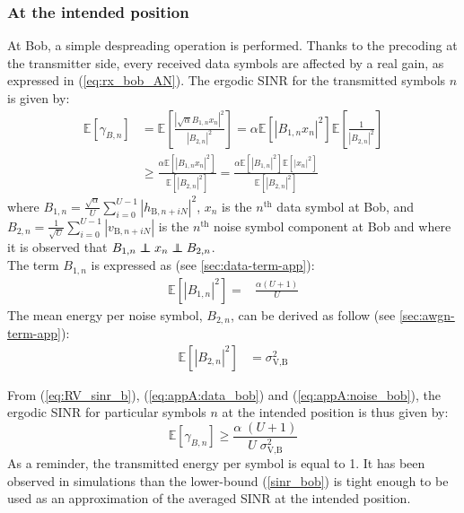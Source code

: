 \documentclass[journal,comsoc]{IEEEtran}
\newcommand{\EX}[1]{\mathbb{E} \left[#1\right]}%
\newcommand\independent{\protect\mathpalette{\protect\independenT}{\perp}}
\def\independenT#1#2{\mathrel{\rlap{$#1#2$}\mkern2mu{#1#2}}}
\begin{document}
\subsubsection{At the intended position}
At Bob, a simple despreading operation is performed. Thanks to the precoding at the transmitter side, every received data symbols are affected by a real gain, as expressed in (\ref{eq:rx_bob_AN}). The ergodic SINR for the transmitted symbols $n$ is given by:
\begin{equation}
\begin{split}
\EX{\gamma_{B,n}} &= \EX{ \frac{  \left| \sqrt{\alpha} B_{1,n} x_n \right|^2  }{  \left| B_{2,n} \right|^2} }  = \alpha \EX{\left| B_{1,n}  x_n\right|^2}  \EX{\frac{1}{\left| B_{2,n} \right|^2}}  \\
& \geq  \frac{\alpha \EX{  \left| B_{1,n}  x_n\right|^2 } }{\EX{ \left| B_{2,n} \right|^2 }} =  \frac{\alpha \EX{ \left|B_{1,n}  \right|^2 } \EX{ \left| x_n \right|^2 } }{\EX{ \left| B_{2,n} \right|^2 }}
\label{eq:RV_sinr_b}
\end{split}
\end{equation}
where $B_{1,n} = \frac{\sqrt{\alpha}}{U}\sum_{i=0}^{U-1} \left| h_{\text{B}, n + iN}\right|^2$, $x_n$ is the $n^{\text{th}}$ data symbol at Bob, and $B_{2,n} = \frac{1}{\sqrt{U}}\sum_{i=0}^{U-1} \left| v_{\text{B}, n + iN}\right|$ is the $n^{\text{th}}$ noise symbol component at Bob and where it is observed that $B_{1,n} \independent x_n \independent B_{2,n}$.\\
The term $B_{1,n}$ is expressed as (see \ref{sec:data-term-app}):
\begin{equation}
	\begin{split}
	\EX{|B_{1,n}|^2} =& \frac{\alpha (U+1)}{U}
	\end{split}
	\label{eq:appA:data_bob}
\end{equation}
The mean energy per noise symbol, $B_{2,n}$, can be derived as follow (see \ref{sec:awgn-term-app}):
\begin{equation}
	\begin{split}
	\EX{|B_{2,n}|^2} &= \sigma^2_{\text{V,B}}
	\end{split}
	\label{eq:appA:noise_bob}
\end{equation}

From (\ref{eq:RV_sinr_b}), (\ref{eq:appA:data_bob}) and (\ref{eq:appA:noise_bob}), the ergodic SINR for particular symbols $n$ at the intended position is thus given by:
\begin{equation}
\EX{\gamma_{B,n}} \geq \frac{\alpha \;(U+1)}{U \; \sigma_{\text{V,B}}^2}
\label{sinr_bob}
\end{equation}
As a reminder, the transmitted energy per symbol is equal to 1. It has been observed in simulations than the lower-bound (\ref{sinr_bob}) is tight enough to be used as an approximation of the averaged SINR at the intended position. 
\end{document}
